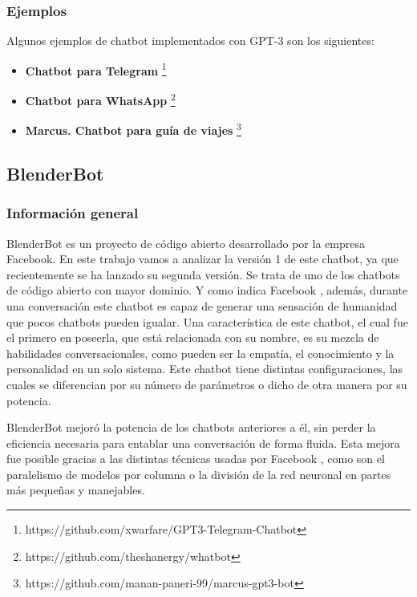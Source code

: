\subsubsection*{Ejemplos}

Algunos ejemplos de chatbot implementados con GPT-3 son los siguientes:

\begin{itemize}
\item \textbf{Chatbot para Telegram} \footnote{https://github.com/xwarfare/GPT3-Telegram-Chatbot}
\item \textbf{Chatbot para WhatsApp} \footnote{https://github.com/theshanergy/whatbot}
\item \textbf{Marcus. Chatbot para guía de viajes} \footnote{https://github.com/manan-paneri-99/marcus-gpt3-bot}
\end{itemize}


\subsection{BlenderBot}

\subsubsection*{Información general}

BlenderBot es un proyecto de código abierto desarrollado por la empresa Facebook. En este trabajo vamos a analizar la versión 1 de este chatbot, ya que recientemente se ha lanzado su segunda versión. Se trata de uno de los chatbots de código abierto con mayor dominio. Y como indica Facebook \cite{RefWorks:RefID:41-roller2020recipes}, además, durante una conversación este chatbot es capaz de generar una sensación de humanidad que pocos chatbots pueden igualar. Una característica de este chatbot, el cual fue el primero en poseerla, que está relacionada con su nombre, es su mezcla de habilidades conversacionales, como pueden ser la empatía, el conocimiento y la personalidad en un solo sistema. Este chatbot tiene distintas configuraciones, las cuales se diferencian por su número de parámetros o dicho de otra manera por su potencia.

BlenderBot mejoró la potencia de los chatbots anteriores a él, sin perder la eficiencia necesaria para entablar una conversación de forma fluida. Esta mejora fue posible gracias a las distintas técnicas usadas por Facebook \cite{RefWorks:RefID:41-roller2020recipes}, como son el paralelismo de modelos por columna o la división de la red neuronal en partes más pequeñas y manejables.

